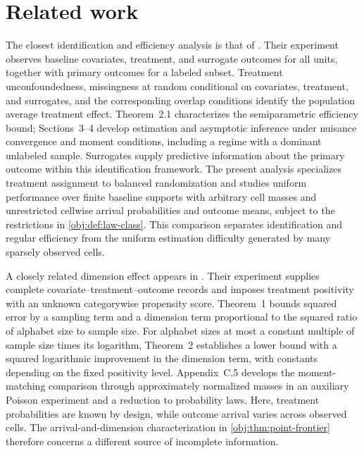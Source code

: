 \section{Related work}

The closest identification and efficiency analysis is that of \citet[Lemma~1.1 under Assumptions~1--3, Theorem~2.1, and Sections~3--4]{KallusMao2025}. Their experiment observes baseline covariates, treatment, and surrogate outcomes for all units, together with primary outcomes for a labeled subset. Treatment unconfoundedness, missingness at random conditional on covariates, treatment, and surrogates, and the corresponding overlap conditions identify the population average treatment effect. Theorem~2.1 characterizes the semiparametric efficiency bound; Sections~3--4 develop estimation and asymptotic inference under nuisance convergence and moment conditions, including a regime with a dominant unlabeled sample. Surrogates supply predictive information about the primary outcome within this identification framework. The present analysis specializes treatment assignment to balanced randomization and studies uniform performance over finite baseline supports with arbitrary cell masses and unrestricted cellwise arrival probabilities and outcome means, subject to the restrictions in \cref{obj:def:law-class}. This comparison separates identification and regular efficiency from the uniform estimation difficulty generated by many sparsely observed cells.

A closely related dimension effect appears in \citet[Theorems~1--2 and Appendix~C.5]{ZengBalakrishnanHanKennedy2024}. Their experiment supplies complete covariate--treatment--outcome records and imposes treatment positivity with an unknown categorywise propensity score. Theorem~1 bounds squared error by a sampling term and a dimension term proportional to the squared ratio of alphabet size to sample size. For alphabet sizes at most a constant multiple of sample size times its logarithm, Theorem~2 establishes a lower bound with a squared logarithmic improvement in the dimension term, with constants depending on the fixed positivity level. Appendix~C.5 develops the moment-matching comparison through approximately normalized masses in an auxiliary Poisson experiment and a reduction to probability laws. Here, treatment probabilities are known by design, while outcome arrival varies across observed cells. The arrival-and-dimension characterization in \cref{obj:thm:point-frontier} therefore concerns a different source of incomplete information.

